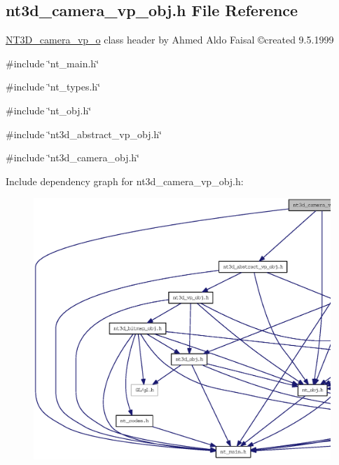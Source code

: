\subsection{nt3d\_\-camera\_\-vp\_\-obj.h File Reference}
\label{nt3d__camera__vp__obj_8h}



\begin{DoxyItemize}
\item \hyperlink{class_n_t3_d__camera__vp__o}{NT3D\_\-camera\_\-vp\_\-o} class header by Ahmed Aldo Faisal \copyright created 9.5.1999 
\end{DoxyItemize} 


{\ttfamily \#include \char`\"{}nt\_\-main.h\char`\"{}}\par
{\ttfamily \#include \char`\"{}nt\_\-types.h\char`\"{}}\par
{\ttfamily \#include \char`\"{}nt\_\-obj.h\char`\"{}}\par
{\ttfamily \#include \char`\"{}nt3d\_\-abstract\_\-vp\_\-obj.h\char`\"{}}\par
{\ttfamily \#include \char`\"{}nt3d\_\-camera\_\-obj.h\char`\"{}}\par
Include dependency graph for nt3d\_\-camera\_\-vp\_\-obj.h:
\nopagebreak
\begin{figure}[H]
\begin{center}
\leavevmode
\includegraphics[width=400pt]{nt3d__camera__vp__obj_8h__incl}
\end{center}
\end{figure}

